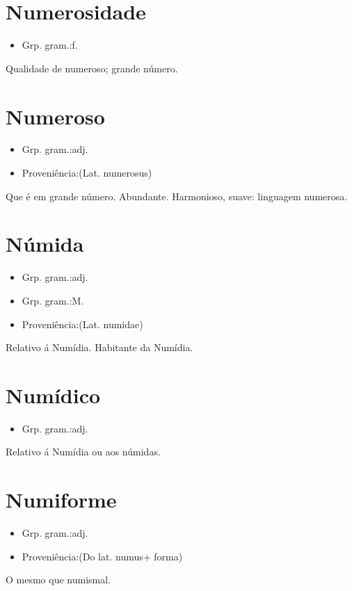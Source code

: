 \section{Numerosidade}
\begin{itemize}
\item {Grp. gram.:f.}
\end{itemize}
Qualidade de numeroso; grande número.
\section{Numeroso}
\begin{itemize}
\item {Grp. gram.:adj.}
\end{itemize}
\begin{itemize}
\item {Proveniência:(Lat. \textunderscore numerosus\textunderscore )}
\end{itemize}
Que é em grande número.
Abundante.
Harmonioso, suave: \textunderscore linguagem numerosa\textunderscore .
\section{Númida}
\begin{itemize}
\item {Grp. gram.:adj.}
\end{itemize}
\begin{itemize}
\item {Grp. gram.:M.}
\end{itemize}
\begin{itemize}
\item {Proveniência:(Lat. \textunderscore numidae\textunderscore )}
\end{itemize}
Relativo á Numídia.
Habitante da Numídia.
\section{Numídico}
\begin{itemize}
\item {Grp. gram.:adj.}
\end{itemize}
Relativo á Numídia ou aos númidas.
\section{Numiforme}
\begin{itemize}
\item {Grp. gram.:adj.}
\end{itemize}
\begin{itemize}
\item {Proveniência:(Do lat. \textunderscore numus\textunderscore  + \textunderscore forma\textunderscore )}
\end{itemize}
O mesmo que \textunderscore numismal\textunderscore .
